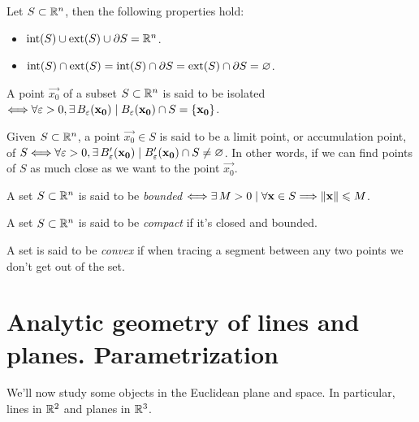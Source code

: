 \begin{prop}
	Let $S\subset\Rtn$, then the following properties hold:
	\begin{itemize}[itemsep = -2pt]
		\item $\interior{S}\cup\exterior{S}\cup\frontier{S} = \Rtn$.
		\item $\interior{S}\cap\exterior{S} = \interior{S}\cap\frontier{S} = \exterior{S}\cap\frontier{S} = \O$.
	\end{itemize}
\end{prop}

\begin{defn}
A point $\vec{x_0}$ of a subset $S\subset\Rtn$ is said to be isolated $\iff\forall\epsilon > 0, \exists B_\epsilon\argopen(\vec{x_0}
	\argclose)\st B_\epsilon\argopen(\vec{x_0}\argclose)\cap S = \{\vec{x_0}\}$.
\end{defn}

\begin{defn}
Given $S\subset\Rtn$, a point $\vec{x_0}\in S$ is said to be a limit point, or accumulation point, of $S\iff\forall\epsilon > 0, 
	\exists B'_\epsilon\argopen(\vec{x_0}\argclose)\st B'_\epsilon\argopen(\vec{x_0}\argclose)\cap S\neq\O$. In other words, 
	if we can find points of $S$ as much close as we want to the point $\vec{x_0}$.
\end{defn}

\begin{defn}
A set $S\subset\Rtn$ is said to be \textit{bounded} $\iff\exists M > 0\st\forall\vec{x}\in S\implies \vnorm{\vec{x}}\leq M$.
\end{defn}

\begin{defn}
A set $S\subset\Rtn$ is said to be \textit{compact} if it's closed and bounded.
\end{defn}

\begin{defn}
A set is said to be \textit{convex} if when tracing a segment between any two points we don't get out of the set.
\end{defn}

\section{Analytic geometry of lines and planes. Parametrization}
We'll now study some objects in the Euclidean plane and space. In particular, lines in $\R^2$ and planes in $\R^3$.

